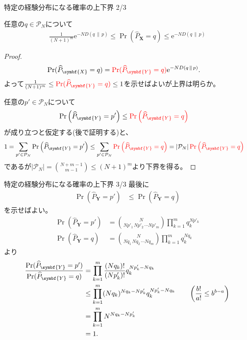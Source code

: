 \documentclass[lualatex,handout]{beamer}
\newcommand{\mycolor}[2]{%
  \begingroup
  \colorlet{currentcolor}{.}%
  \color{#1}#2%
  \color{currentcolor}%
  \endgroup
}
\newcommand{\emm}[1]{\mycolor{red}{#1}}
\newcommand\KL[2]{D\left(#1\,\|\,#2\right)}
\theoremstyle{definition}
\begin{document}
\begin{frame}{特定の経験分布になる確率の上下界 2/3}
\footnotesize
\begin{lemma}
任意の$q\in\mathcal{P}_N$について
\begin{align*}
\frac1{(N+1)^m}\mathrm{e}^{-N \KL{q}{p}}\le
\Pr(\widehat{P}_{\symbf{X}} = q)
\le \mathrm{e}^{-N \KL{q}{p}}
\end{align*}
\end{lemma}
\begin{proof}
\vspace{-2em}
\begin{align*}
\Pr(\widehat{P}_{\symbf{X}}= q) &= \emm{\Pr(\widehat{P}_{\symbf{Y}}= q)}\mathrm{e}^{-N \KL{q}{p}}.
\end{align*}
よって$\frac1{(N+1)^m}\le\emm{\Pr(\widehat{P}_{\symbf{Y}}= q)}\le 1$を示せばよいが上界は明らか。

%
任意の$p'\in\mathcal{P}_N$について
\begin{align*}
\Pr\left(\widehat{P}_{\symbf{Y}}= p'\right)&\le
\emm{\Pr\left(\widehat{P}_{\symbf{Y}}= q\right)}
\end{align*}
が成り立つと仮定する(後で証明する)と、
\begin{align*}
1&=\sum_{p'\in\mathcal{P}_N} \Pr\left(\widehat{P}_{\symbf{Y}}= p'\right)
\le\sum_{p'\in\mathcal{P}_N} \emm{\Pr\left(\widehat{P}_{\symbf{Y}}= q\right)}
=|\mathcal{P}_N| \emm{\Pr\left(\widehat{P}_{\symbf{Y}}= q\right)}
\end{align*}
であるが$|\mathcal{P}_N|=\binom{N+m-1}{m-1}\le (N+1)^m$より下界を得る。
\end{proof}
\end{frame}

\begin{frame}{特定の経験分布になる確率の上下界 3/3}
\small
最後に
\begin{align*}
\Pr\left(\widehat{P}_{\symbf{Y}}= p'\right)&\le
\Pr\left(\widehat{P}_{\symbf{Y}}= q\right)
\end{align*}
を示せばよい。
\begin{align*}
\Pr(\widehat{P}_{\symbf{Y}}= p') &= \binom{N}{Np'_1\,Np'_2\,\dotsm Np'_m} \prod_{k=1}^m q_k^{Np'_k}\\
\Pr(\widehat{P}_{\symbf{Y}}= q) &= \binom{N}{Nq_1\,Nq_2\,\dotsm Nq_m} \prod_{k=1}^m q_k^{Nq_k}
\end{align*}
より
\begin{align*}
\frac{\Pr(\widehat{P}_{\symbf{Y}}= p')}{\Pr(\widehat{P}_{\symbf{Y}}= q)}&=\prod_{k=1}^m\frac{(Nq_k)!}{(Np'_k)!}q_k^{Np'_k-Nq_k}\\
&\le\prod_{k=1}^m(Nq_k)^{Nq_k - Np'_k}q_k^{Np'_k-Nq_k}\qquad \left(\frac{b!}{a!}\le b^{b-a}\right)\\
&=\prod_{k=1}^mN^{Nq_k - Np'_k}\\
&=1.\qedhere
\end{align*}
\end{frame}
\end{document}

